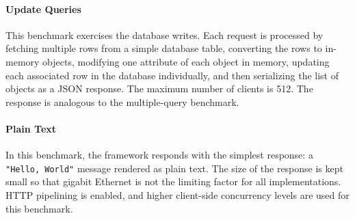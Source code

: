 
\paragraph{Update Queries}
This benchmark exercises the database writes.
Each request is processed by fetching multiple rows from a simple database table, converting the rows to in-memory objects, modifying one attribute of each object in memory, updating each associated row in the database individually, and then serializing the list of objects as a JSON response.
The maximum number of clients is 512.
The response is analogous to the multiple-query benchmark.

\paragraph{Plain Text}
In this benchmark, the framework responds with the simplest response: a \texttt{"Hello, World"} message rendered as plain text.
The size of the response is kept small so that gigabit Ethernet is not the limiting factor for all implementations.
HTTP pipelining is enabled, and higher client-side concurrency levels are used for this benchmark.

